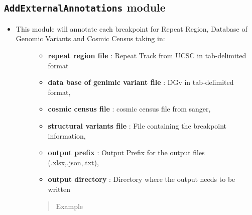 \documentclass[letterpaper,10pt,english]{sphinxmanual}
\begin{document}
\subsection{\texttt{AddExternalAnnotations} module}
\label{iAnnotateSV:addexternalannotations-module}\begin{itemize}
\item {} \begin{description}
\item[{This module will annotate each breakpoint for Repeat Region, Database of Genomic Variants and Cosmic Census taking in:}] \leavevmode\begin{itemize}
\item {} 
\textbf{repeat region file} : Repeat Track from UCSC in tab-delimited format

\item {} 
\textbf{data base of genimic variant file} : DGv in tab-delimited format,

\item {} 
\textbf{cosmic census file} : cosmic census file from sanger,

\item {} 
\textbf{structural variants file} : File containing the breakpoint information,

\item {} 
\textbf{output prefix} : Output Prefix for the output files (.xlsx,.json,.txt),

\item {} 
\textbf{output directory} : Directory where the output needs to be written

\end{itemize}
\begin{quote}\begin{description}
\item[{Example}] \leavevmode
{}


\end{description}\end{quote}

\end{description}

\end{itemize}
\end{document}
